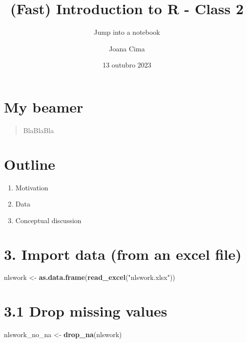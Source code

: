 \documentclass[
]{article}
\title{(Fast) Introduction to R - Class 2}
\subtitle{Jump into a notebook}
\author{Joana Cima}
\date{13 outubro 2023}
\newenvironment{Shaded}{\begin{snugshade}}{\end{snugshade}}
\newcommand{\FunctionTok}[1]{\textcolor[rgb]{0.13,0.29,0.53}{\textbf{#1}}}
\newcommand{\NormalTok}[1]{#1}
\newcommand{\OtherTok}[1]{\textcolor[rgb]{0.56,0.35,0.01}{#1}}
\newcommand{\StringTok}[1]{\textcolor[rgb]{0.31,0.60,0.02}{#1}}
\providecommand{\tightlist}{%
  \setlength{\itemsep}{0pt}\setlength{\parskip}{0pt}}
\begin{document}
\maketitle

\hypertarget{my-beamer}{%
\section{My beamer}\label{my-beamer}}

\begin{quote}
BlaBlaBla
\end{quote}

\hypertarget{outline}{%
\section{Outline}\label{outline}}

\begin{enumerate}
\def\labelenumi{\arabic{enumi}.}
\tightlist
\item
  Motivation
\item
  Data
\item
  Conceptual discussion
\end{enumerate}

\hypertarget{import-data-from-an-excel-file}{%
\section{3. Import data (from an excel
file)}\label{import-data-from-an-excel-file}}

\begin{Shaded}
\begin{Highlighting}[]
\NormalTok{nlswork }\OtherTok{\textless{}{-}} \FunctionTok{as.data.frame}\NormalTok{(}\FunctionTok{read\_excel}\NormalTok{(}\StringTok{"nlswork.xlsx"}\NormalTok{))}
\end{Highlighting}
\end{Shaded}

\hypertarget{drop-missing-values}{%
\section{3.1 Drop missing values}\label{drop-missing-values}}

\begin{Shaded}
\begin{Highlighting}[]
\NormalTok{nlswork\_no\_na }\OtherTok{\textless{}{-}} \FunctionTok{drop\_na}\NormalTok{(nlswork)}
\end{Highlighting}
\end{Shaded}
\end{document}
